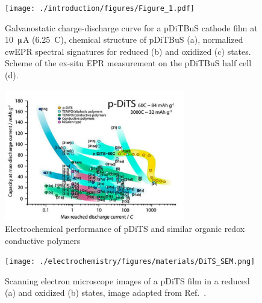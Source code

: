 \begin{figure}
	\texttt{[image: ./introduction/figures/Figure\_1.pdf]}
	\caption{Galvanostatic charge-discharge curve for a pDiTBuS cathode film at 10~$\muup$A (6.25~C), chemical structure of pDiTBuS (a), normalized cwEPR spectral signatures for reduced (b) and oxidized (c) states. Scheme of the ex-situ EPR measurement on the pDiTBuS half cell (d).}
	\label{fig:Figure_1}
\end{figure}


\begin{figure}
	\includegraphics[width=0.7\textwidth]{./electrochemistry/figures/dits_ragone.pdf}
	\caption{Electrochemical performance of pDiTS and similar organic redox conductive polymers~\cite{Vereshchagin2020}}
	\label{fig:dits_ragone}
\end{figure}



\begin{figure}%
	\texttt{[image: ./electrochemistry/figures/materials/DiTS\_SEM.png]}
	\caption{Scanning electron microscope images of a pDiTS film in a reduced (a) and oxidized (b) states, image adapted from Ref.~\cite{Vereshchagin2020}.}
	\label{fig:Figure_1}
\end{figure}


